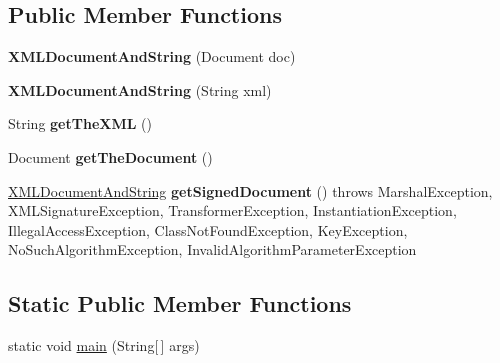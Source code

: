 \subsection*{Public Member Functions}
\begin{DoxyCompactItemize}
\item 
\hypertarget{classgov_1_1fnal_1_1ppd_1_1dd_1_1xml_1_1XMLDocumentAndString_a785a51fa8313f57b711a6f0234e8282c}{{\bfseries X\-M\-L\-Document\-And\-String} (Document doc)}\label{classgov_1_1fnal_1_1ppd_1_1dd_1_1xml_1_1XMLDocumentAndString_a785a51fa8313f57b711a6f0234e8282c}

\item 
\hypertarget{classgov_1_1fnal_1_1ppd_1_1dd_1_1xml_1_1XMLDocumentAndString_acdfa3bc11f59b1dbff8cb5c18e09c143}{{\bfseries X\-M\-L\-Document\-And\-String} (String xml)}\label{classgov_1_1fnal_1_1ppd_1_1dd_1_1xml_1_1XMLDocumentAndString_acdfa3bc11f59b1dbff8cb5c18e09c143}

\item 
\hypertarget{classgov_1_1fnal_1_1ppd_1_1dd_1_1xml_1_1XMLDocumentAndString_a81c3dc4d99ae73f079d52008fd963990}{String {\bfseries get\-The\-X\-M\-L} ()}\label{classgov_1_1fnal_1_1ppd_1_1dd_1_1xml_1_1XMLDocumentAndString_a81c3dc4d99ae73f079d52008fd963990}

\item 
\hypertarget{classgov_1_1fnal_1_1ppd_1_1dd_1_1xml_1_1XMLDocumentAndString_aabe02a98c1824eb358467f6378594e2f}{Document {\bfseries get\-The\-Document} ()}\label{classgov_1_1fnal_1_1ppd_1_1dd_1_1xml_1_1XMLDocumentAndString_aabe02a98c1824eb358467f6378594e2f}

\item 
\hypertarget{classgov_1_1fnal_1_1ppd_1_1dd_1_1xml_1_1XMLDocumentAndString_ad8066c55eff8ed13617381bea2c98aab}{\hyperlink{classgov_1_1fnal_1_1ppd_1_1dd_1_1xml_1_1XMLDocumentAndString}{X\-M\-L\-Document\-And\-String} {\bfseries get\-Signed\-Document} ()  throws Marshal\-Exception, X\-M\-L\-Signature\-Exception, Transformer\-Exception, Instantiation\-Exception, Illegal\-Access\-Exception, 			\-Class\-Not\-Found\-Exception, Key\-Exception, No\-Such\-Algorithm\-Exception, Invalid\-Algorithm\-Parameter\-Exception }\label{classgov_1_1fnal_1_1ppd_1_1dd_1_1xml_1_1XMLDocumentAndString_ad8066c55eff8ed13617381bea2c98aab}

\end{DoxyCompactItemize}
\subsection*{Static Public Member Functions}
\begin{DoxyCompactItemize}
\item 
static void \hyperlink{classgov_1_1fnal_1_1ppd_1_1dd_1_1xml_1_1XMLDocumentAndString_a753ec174577aa0b799a56b8fd1f055e0}{main} (String\mbox{[}$\,$\mbox{]} args)
\end{DoxyCompactItemize}


